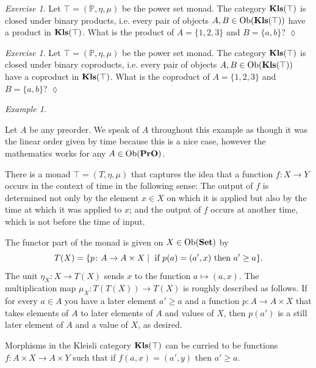 \documentclass{book}
\def\tn{\textnormal}
\def\PP{{\mathbb P}}
\def\Ob{\tn{Ob}}
\def\to{\rightarrow}
\def\taking{\colon}
\def\|{{\;|\;}}
\def\Kls{{\bf Kls}}
\def\Set{{\bf Set}}
\def\PrO{{\bf PrO}}
\theoremstyle{remark}
\newtheorem{example}[subsubsection]{Example}
\newtheorem{exc}[subsubsection]{Exercise}
\newenvironment{exercise}{\begin{exc}}{\hspace*{\fill}$\lozenge$\end{exc}}
\theoremstyle{definition}
\begin{document}
\begin{exercise}
Let $\top=(\PP,\eta,\mu)$ be the power set monad. The category $\Kls(\top)$ is closed under binary products, i.e. every pair of objects $A,B\in\Ob(\Kls(\top))$ have a product in $\Kls(\top)$. What is the product of $A=\{1,2,3\}$ and $B=\{a,b\}$?
\end{exercise}

\begin{exercise}
Let $\top=(\PP,\eta,\mu)$ be the power set monad. The category $\Kls(\top)$ is closed under binary coproducts, i.e. every pair of objects $A,B\in\Ob(\Kls(\top))$ have a coproduct in $\Kls(\top)$. What is the coproduct of $A=\{1,2,3\}$ and $B=\{a,b\}$?
\end{exercise}

\begin{example}\label{ex:preorder monad}

Let $A$ be any preorder. We speak of $A$ throughout this example as though it was the linear order given by time because this is a nice case, however the mathematics works for any $A\in\Ob(\PrO)$. 

There is a monad $\top=(T,\eta,\mu)$ that captures the idea that a function $f\taking X\to Y$ occurs in the context of time in the following sense: The output of $f$ is determined not only by the element $x\in X$ on which it is applied but also by the time at which it was applied to $x$; and the output of $f$ occurs at another time, which is not before the time of input.

The functor part of the monad is given on $X\in\Ob(\Set)$ by
$$T(X)=\{p\taking A\to A\times X\|\tn{ if } p(a)=(a',x)\tn{ then } a'\geq a\}.$$
The unit $\eta_X\taking X\to T(X)$ sends $x$ to the function $a\mapsto (a,x)$. The multiplication map $\mu_X\taking T(T(X))\to T(X)$ is roughly described as follows. If for every $a\in A$ you have a later element $a'\geq a$ and a function $p\taking A\to A\times X$ that takes elements of $A$ to later elements of $A$ and values of $X$, then $p(a')$ is a still later element of $A$ and a value of $X$, as desired.

Morphisms in the Kleisli category $\Kls(\top)$ can be curried to be functions $f\taking A\times X\to A\times Y$ such that if $f(a,x)=(a',y)$ then $a'\geq a$. 

\end{example}
\end{document}
